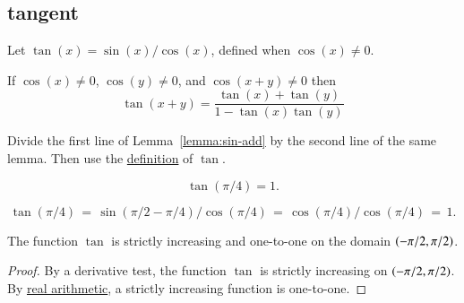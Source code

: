 \subsection{tangent}
\label{sec:tangent}

\begin{definition}[tangent]\label{def:tan}
Let $\tan(x) = \sin(x)/\cos(x)$, defined when $\cos(x)\ne0$.
%
%
\end{definition}


\begin{lemma}[]
\label{lemma:tan-add}
If $\cos(x)\ne 0$, $\cos(y)\ne 0$, and $\cos(x+y)\ne0$ then
\begin{displaymath}\tan(x+y) = \frac{\tan(x) + \tan(y) }{ 1 -
    \tan(x)\tan(y)}\end{displaymath}
\end{lemma}
%

\begin{proved}
  Divide the first line of Lemma~\ref{lemma:sin-add} by the second
  line of the same lemma.  Then use the \hyperref[def:tan]{definition}
  of $\tan$.  \swallowed\end{proved}

\begin{lemma}[]\label{lemma:tan-pi4}
\begin{displaymath}\tan(\pi/4) = 1.\end{displaymath}
\end{lemma}

\begin{proved}  
\begin{displaymath}
\tan(\pi/4) \hyperref[def:tan]{\,=\,} \sin(\pi/2-\pi/4)/\cos(\pi/4) 
  \hyperref[lemma:cos-sin]{\,=\,}
  \cos(\pi/4)/\cos(\pi/4) \hyperref[eqn:cospi2]{\,=\,} 1.
\end{displaymath}
\swallowed\end{proved}

\begin{lemma}[]\label{lemma:tan-monotone}
The function $\tan$ is strictly increasing and one-to-one on the domain
$(-\pi/2,\pi/2)$.
\end{lemma}

\begin{proof} By a derivative test, the function $\tan$ is strictly
  increasing on $(-\pi/2,\pi/2)$.  By
  \hyperref[back:analysis]{real arithmetic}, a strictly increasing
  function is one-to-one.
\end{proof}


